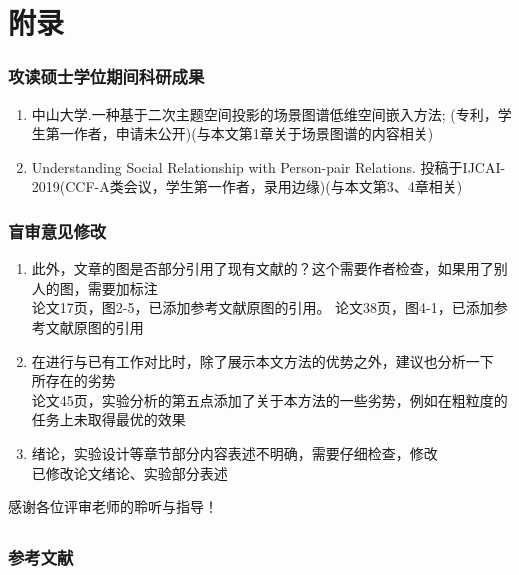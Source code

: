 \documentclass[UTF8]{beamer}
\newcommand{\kai}{\CJKfamily{kai}}
\begin{document}
\section{附录}

\begin{frame}
    \frametitle{攻读硕士学位期间科研成果}
    \small{
         \begin{enumerate}
         \item 中山大学.一种基于二次主题空间投影的场景图谱低维空间嵌入方法; (专利，学生第一作者，申请未公开)(与本文第1章关于场景图谱的内容相关)
         \item Understanding Social Relationship with Person-pair Relations. 投稿于IJCAI-2019(CCF-A类会议，学生第一作者，录用边缘)(与本文第3、4章相关)
         \end{enumerate}
    }
\end{frame}

\begin{frame}
    \frametitle{盲审意见修改}
    \small{
         \begin{enumerate}

         \item 此外，文章的图是否部分引用了现有文献的？这个需要作者检查，如果用了别人的图，需要加标注\\
         {\kai 论文17页，图2-5，已添加参考文献原图的引用。
                论文38页，图4-1，已添加参考文献原图的引用}
         \item 在进行与已有工作对比时，除了展示本文方法的优势之外，建议也分析一下
                    所存在的劣势\\
         {\kai 论文45页，实验分析的第五点添加了关于本方法的一些劣势，例如在粗粒度的任务上未取得最优的效果}
         \item 绪论，实验设计等章节部分内容表述不明确，需要仔细检查，修改 \\
         {\kai 已修改论文绪论、实验部分表述}
         \end{enumerate}
    }
\end{frame}

\begin{frame}
    \centerline{\large{感谢各位评审老师的聆听与指导！}}
\end{frame}

\subsection{ }
\begin{frame}[allowframebreaks]
    \frametitle{参考文献}
    \tiny
    \printbibliography
\end{frame}
\end{document}
